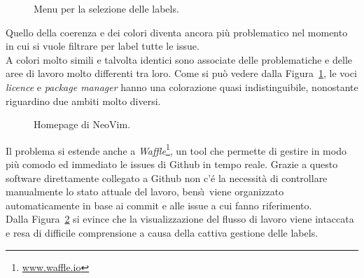 \documentclass[12pt]{article} %
\begin{document}
\begin{figure}[H]
\caption{Menu per la selezione delle labels.}
\label{fig:cattivoesempio2}
\end{figure}

Quello della coerenza e dei colori diventa ancora pi\`u problematico nel momento in cui si vuole filtrare per label tutte le issue.\\
A colori molto simili e talvolta identici sono associate delle problematiche e delle aree di lavoro molto differenti tra loro. Come si pu\`o vedere dalla Figura~\ref{fig:cattivoesempio2}, le voci \emph{licence} e \emph{package manager} hanno una colorazione quasi indistinguibile, nonostante riguardino due ambiti molto diversi.

\begin{figure}[H]
\caption{Homepage di NeoVim.}
\label{fig:cattivoesempio3}
\end{figure}

Il problema si estende anche a \emph{Waffle}\footnote{\url{www.waffle.io}}, un tool che permette di gestire in modo pi\`u comodo ed immediato le issues di Github in tempo reale. Grazie a questo software direttamente collegato a Github non c'\'e la necessit\`a di controllare manualmente lo stato attuale del lavoro, bens\`\i\ viene organizzato automaticamente in base ai commit e alle issue a cui fanno riferimento.\\
Dalla Figura~\ref{fig:cattivoesempio3} si evince che la visualizzazione del flusso di lavoro viene intaccata e resa di difficile comprensione a causa della cattiva gestione delle labels.
\end{document}
